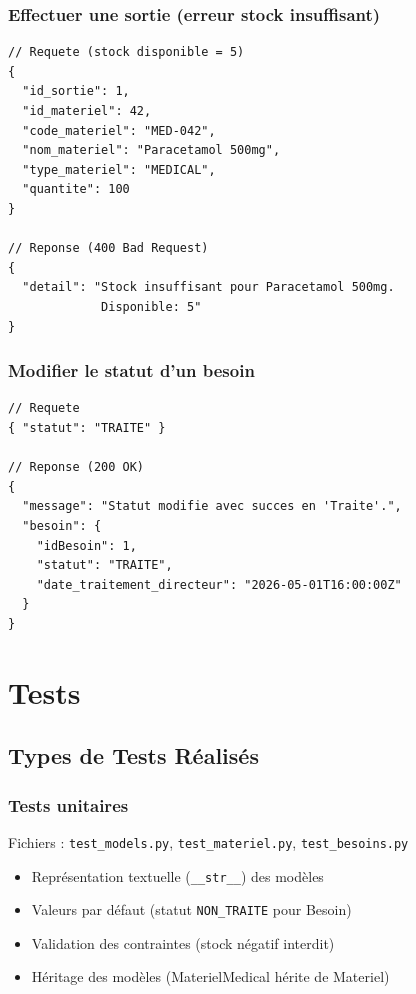 \documentclass[12pt,a4paper]{report}
\begin{document}
\section{Effectuer une sortie (erreur stock insuffisant)}
\begin{lstlisting}[title=POST /api/compta\_matiere/lignes-sortie/ (400)]
// Requete (stock disponible = 5)
{
  "id_sortie": 1,
  "id_materiel": 42,
  "code_materiel": "MED-042",
  "nom_materiel": "Paracetamol 500mg",
  "type_materiel": "MEDICAL",
  "quantite": 100
}

// Reponse (400 Bad Request)
{
  "detail": "Stock insuffisant pour Paracetamol 500mg.
             Disponible: 5"
}
\end{lstlisting}

\section{Modifier le statut d'un besoin}
\begin{lstlisting}[title=PATCH /api/compta\_matiere/besoins/1/modifier\_statut/]
// Requete
{ "statut": "TRAITE" }

// Reponse (200 OK)
{
  "message": "Statut modifie avec succes en 'Traite'.",
  "besoin": {
    "idBesoin": 1,
    "statut": "TRAITE",
    "date_traitement_directeur": "2026-05-01T16:00:00Z"
  }
}
\end{lstlisting}

\part{Tests}

\chapter{Types de Tests Réalisés}

\section{Tests unitaires}
Fichiers : \texttt{test\_models.py}, \texttt{test\_materiel.py}, \texttt{test\_besoins.py}
\begin{itemize}
    \item Représentation textuelle (\texttt{\_\_str\_\_}) des modèles
    \item Valeurs par défaut (statut \texttt{NON\_TRAITE} pour Besoin)
    \item Validation des contraintes (stock négatif interdit)
    \item Héritage des modèles (MaterielMedical hérite de Materiel)
\end{itemize}
\end{document}

